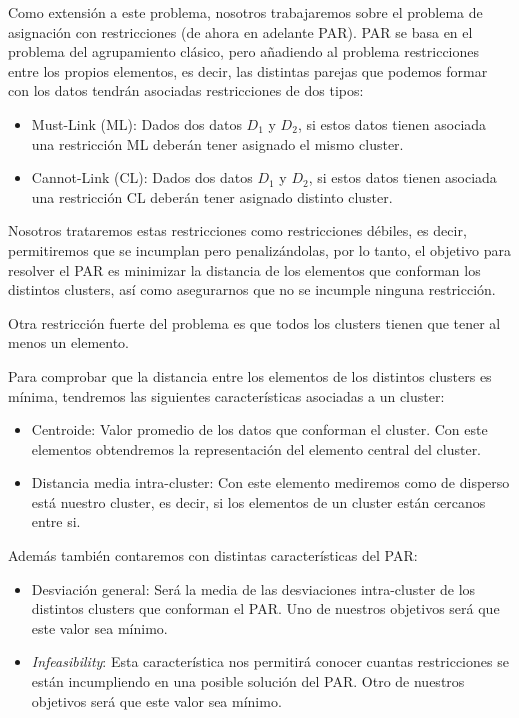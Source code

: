 \documentclass[12pt, spanish]{article}
\begin{document}
Como extensión a este problema, nosotros trabajaremos sobre el problema de asignación con restricciones (de ahora en adelante PAR). PAR se basa en el problema del agrupamiento clásico, pero añadiendo al problema restricciones entre los propios elementos, es decir, las distintas parejas que podemos formar con los datos tendrán asociadas restricciones de dos tipos:

\begin{itemize}
	\item{Must-Link (ML): Dados dos datos $D_1$ y $D_2$, si estos datos tienen asociada una restricción ML deberán tener asignado el mismo cluster.}
	\item{Cannot-Link (CL): Dados dos datos $D_1$ y $D_2$, si estos datos tienen asociada una restricción CL deberán tener asignado distinto cluster.}
\end{itemize}

Nosotros trataremos estas restricciones como restricciones débiles, es decir, permitiremos que se incumplan pero penalizándolas, por lo tanto, el objetivo para resolver el PAR es minimizar la distancia de los elementos que conforman los distintos clusters, así como asegurarnos que no se incumple ninguna restricción.

Otra restricción fuerte del problema es que todos los clusters tienen que tener al menos un elemento.

Para comprobar que la distancia entre los elementos de los distintos clusters es mínima, tendremos las siguientes características asociadas a un cluster:

\begin{itemize}
	\item{Centroide: Valor promedio de los datos que conforman el cluster. Con este elementos obtendremos la representación del elemento central del cluster.}
	\item{Distancia media intra-cluster: Con este elemento mediremos como de disperso está nuestro cluster, es decir, si los elementos de un cluster están cercanos entre si.}
\end{itemize}

Además también contaremos con distintas características del PAR:

\begin{itemize}
	\item{Desviación general: Será la media de las desviaciones intra-cluster de los distintos clusters que conforman el PAR. Uno de nuestros objetivos será que este valor sea mínimo.}
	\item{\textit{Infeasibility}: Esta característica nos permitirá conocer cuantas restricciones se están incumpliendo en una posible solución del PAR. Otro de nuestros objetivos será que este valor sea mínimo.}
\end{itemize}
\end{document}
